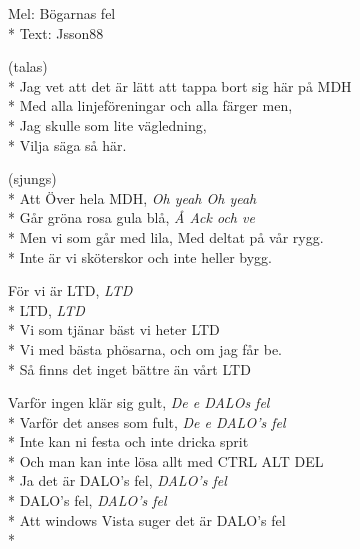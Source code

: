 

\pagestyle{Föreningssånger}

\begin{SongText}
\begin{SongInfo}
Mel: Bögarnas fel\\*%
Text: Jsson88
\end{SongInfo}
\begin{SongVerse}
    (talas)\\*%
    Jag vet att det är lätt att tappa bort sig här på MDH\\*%
    Med alla linjeföreningar och alla färger men, \\*%
    Jag skulle som lite vägledning, \\*%
    Vilja säga så här.
\end{SongVerse}
\begin{SongVerse}
    (sjungs)\\*%
    Att Över hela MDH, \textit{Oh yeah Oh yeah}\\*%
    Går gröna rosa gula blå, \textit{Å Ack och ve}\\*%
    Men vi som går med lila, Med deltat på vår rygg.\\*%
    Inte är vi sköterskor och inte heller bygg.
\end{SongVerse}
\begin{SongVerse}
    För vi är LTD, \textit{LTD}\\*%
    LTD, \textit{LTD}\\*%
    Vi som tjänar bäst vi heter LTD\\*%
    Vi med bästa phösarna, och om jag får be.\\*%
    Så finns det inget bättre än vårt LTD
\end{SongVerse}
\begin{SongVerse}
    Varför ingen klär sig gult, \textit{De e DALOs fel}\\*%
    Varför det anses som fult, \textit{De e DALO's fel}\\*%
    Inte kan ni festa och inte dricka sprit\\*%
    Och man kan inte lösa allt med CTRL ALT DEL\\*%
    Ja det är DALO's fel, \textit{DALO's fel} \\*%
    DALO's fel, \textit{DALO's fel}\\*%
    Att windows Vista suger det är DALO's fel\\*%

\end{SongVerse}
\end{SongText}

